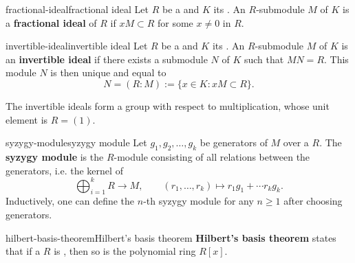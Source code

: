\begin{topic}{fractional-ideal}{fractional ideal}
    Let $R$ be a  and $K$ its . An $R$-submodule $M$ of $K$ is a \textbf{fractional ideal} of $R$ if $xM \subset R$ for some $x \ne 0$ in $R$.
\end{topic}

\begin{topic}{invertible-ideal}{invertible ideal}
    Let $R$ be a  and $K$ its . An $R$-submodule $M$ of $K$ is an \textbf{invertible ideal} if there exists a submodule $N$ of $K$ such that $MN = R$. This module $N$ is then unique and equal to
    \[ N = (R : M) := \{ x \in K : xM \subset R \} . \]
    
    The invertible ideals form a group with respect to multiplication, whose unit element is $R = (1)$.
\end{topic}

\begin{topic}{syzygy-module}{syzygy module}
    Let $g_1, g_2, \ldots, g_k$ be generators of  $M$ over a  $R$. The \textbf{syzygy module} is the $R$-module consisting of all relations between the generators, i.e. the kernel of
    \[ \bigoplus_{i = 1}^{k} R \to M, \qquad (r_1, \ldots, r_k) \mapsto r_1 g_1 + \cdots r_k g_k . \]
    Inductively, one can define the $n$-th syzygy module for any $n \ge 1$ after choosing generators.
\end{topic}

\begin{topic}{hilbert-basis-theorem}{Hilbert's basis theorem}
    \textbf{Hilbert's basis theorem} states that if a  $R$ is , then so is the polynomial ring $R[x]$.
\end{topic}


